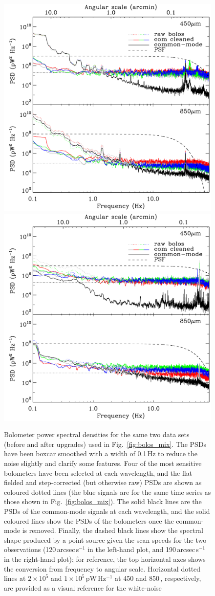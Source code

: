 \documentclass[useAMS,usenatbib,nofootinbib]{mn2e}
\begin{document}
\begin{figure}
\centering
\includegraphics[width=0.49\linewidth]{pspec_s2sro.pdf}
\includegraphics[width=0.49\linewidth]{pspec.pdf}
\caption{Bolometer power spectral densities for the same two data sets
  (before and after upgrades) used in Fig.~\ref{fig:bolos_mix}. The
  PSDs have been boxcar smoothed with a width of 0.1\,Hz to reduce the
  noise slightly and clarify some features. Four of the most sensitive
  bolometers have been selected at each wavelength, and the
  flat-fielded and step-corrected (but otherwise raw) PSDs are shown
  as coloured dotted lines (the blue signals are for the same time
  series as those shown in Fig.~\ref{fig:bolos_mix}).  The solid black
  lines are the PSDs of the common-mode signals at each wavelength,
  and the solid coloured lines show the PSDs of the bolometers once
  the common-mode is removed.  Finally, the dashed black lines show
  the spectral shape produced by a point source given the scan speeds
  for the two observations (120\,arcsec\,s$^{-1}$ in the left-hand
  plot, and 190\,arcsec\,s$^{-1}$ in the right-hand plot); for
  reference, the top horizontal axes shows the conversion from
  frequency to angular scale. Horizontal dotted lines at $2 \times
  10^5$ and $1 \times 10^5$\,pW\,Hz$^{-1}$ at 450 and 850\,\micron,
  respectively, are provided as a visual reference for the white-noise
}
\end{figure}
\end{document}
